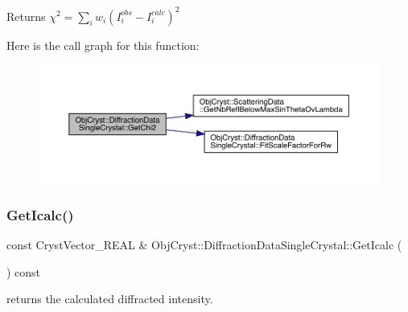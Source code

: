 \begin{DoxyReturn}{Returns}
$ \chi^2 = \sum_i w_i \left(I_i^{obs}-I_i^{calc} \right)^2 $ 
\end{DoxyReturn}
Here is the call graph for this function\+:
\nopagebreak
\begin{figure}[H]
\begin{center}
\leavevmode
\includegraphics[width=350pt]{class_obj_cryst_1_1_diffraction_data_single_crystal_a6525600072e31324bdcb1219f33198cb_cgraph}
\end{center}
\end{figure}
\mbox{\label{class_obj_cryst_1_1_diffraction_data_single_crystal_ae6bc594be6f3e198572516bbe739d851}} 
\subsubsection{\texorpdfstring{GetIcalc()}{GetIcalc()}}
{\footnotesize\ttfamily const Cryst\+Vector\+\_\+\+R\+E\+AL \& Obj\+Cryst\+::\+Diffraction\+Data\+Single\+Crystal\+::\+Get\+Icalc (\begin{DoxyParamCaption}{ }\end{DoxyParamCaption}) const}



returns the calculated diffracted intensity. 

